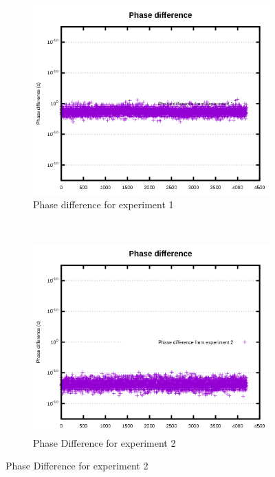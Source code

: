 \begin{figure}[H]
    \begin{subfigure}[t]{.3\textwidth}
        \centering
        \includegraphics[width=\textwidth]{img/prueba1_pd.png}
        \caption{Phase difference for experiment 1}
        \label{fig:prueba1_pd}
    \end{subfigure}
    ~
    \begin{subfigure}[t]{.30\textwidth}
        \centering
        \includegraphics[width=\textwidth]{img/prueba2_pd.png}
        \caption{Phase Difference for experiment 2}
        \label{fig:prueba2_pd}
    \end{subfigure}

\end{figure}
